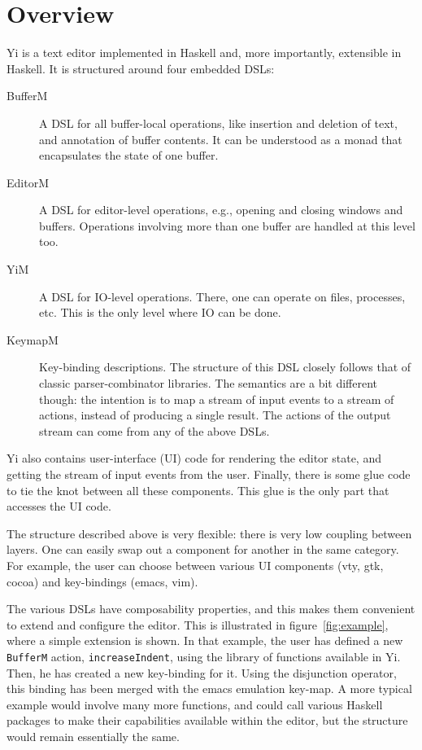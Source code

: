 \documentclass[9pt,indentedstyle,preprint]{sigplanconf}
\begin{document}
\section{Overview}

Yi is a text editor implemented in Haskell and, more importantly, extensible in
Haskell. It is structured around four embedded DSLs:
\begin{description}
\item[BufferM] A DSL for all buffer-local operations, like insertion
  and deletion of text, and annotation of buffer contents. It
  can be understood as a monad that encapsulates the state of one buffer.
\item[EditorM] A DSL for editor-level operations, e.g., opening and closing
  windows and buffers. Operations involving more than one buffer are
  handled at this level too.
\item[YiM] A DSL for IO-level operations. There, one can operate on files,
  processes, etc.  This is the only level where IO can be done.
\item[KeymapM] Key-binding descriptions. The structure of this DSL
  closely follows that of classic parser-combinator libraries.  The
  semantics are a bit different though: the intention is to map a
  stream of input events to a stream of actions, instead of producing
  a single result. The actions of the output stream can come from any
  of the above DSLs.
\end{description}
Yi also contains user-interface (UI) code for rendering the editor
state, and getting the stream of input events from the user.  Finally,
there is some glue code to tie the knot between all these
components. This glue is the only part that accesses the UI code.

The structure described above is very flexible: there is very low coupling between
layers. One can easily swap out a component for another in the same
category. For example, the user can choose between various UI
components (vty, gtk, cocoa) and key-bindings (emacs, vim).

The various DSLs have composability properties, and this makes them
convenient to extend and configure the editor. This is illustrated in
figure~\ref{fig:example}, where a simple extension is shown.  In that
example, the user has defined a new \texttt{BufferM} action,
\texttt{increaseIndent}, using the library of functions available in
Yi. Then, he has created a new key-binding for it. Using the
disjunction operator, this binding has been merged with the emacs
emulation key-map. A more typical example would involve many more
functions, and could call various Haskell packages to make their
capabilities available within the editor, but the structure would
remain essentially the same.
\end{document}
